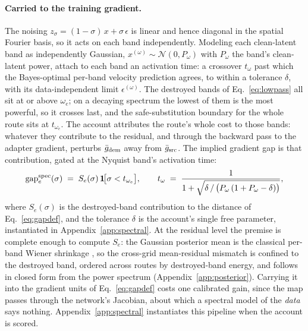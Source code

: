 \paragraph{Carried to the training gradient.}
The noising $z_\sigma = (1-\sigma)\,x + \sigma\,\epsilon$ is linear
and hence diagonal in the spatial Fourier basis, so it acts on each
band independently. Modeling each clean-latent band as independently
Gaussian, $x^{(\omega)} \sim \mathcal{N}(0, P_\omega)$ with
$P_\omega$ the band's clean-latent power, \citet{xiao2026spd} attach
to each band an activation time: a crossover $t_\omega$ past which
the Bayes-optimal per-band velocity prediction agrees, to within a
tolerance $\delta$, with its data-independent limit
$\epsilon^{(\omega)}$.
The destroyed bands of Eq.~\ref{eq:lowpass} all sit at or above
$\omega_e$; on a decaying spectrum the lowest of them is the most
powerful, so it crosses last, and the safe-substitution boundary for
the whole route sits at $t_{\omega_e}$. The account attributes the
route's whole cost to those bands: whatever they contribute to the
residual, and through the backward pass to the adapter gradient,
perturbs $\bar g_{\mathrm{dem}}$ away from $\bar g_{\mathrm{src}}$. The implied
gradient gap is that contribution, gated at the Nyquist band's
activation time:
\begin{equation}
\mathrm{gap}_e^{\mathrm{spec}}(\sigma) \;=\;
S_e(\sigma)\,\mathbf{1}\!\big[\sigma < t_{\omega_e}\big],
\qquad
t_\omega \;=\;
\frac{1}{1 + \sqrt{\delta \,/\, \big(P_\omega\,(1 + P_\omega -
\delta)\big)}},
\label{eq:spd}
\end{equation}
where $S_e(\sigma)$ is the destroyed-band contribution to the distance
of Eq.~\ref{eq:gapdef}, and the tolerance $\delta$ is the account's
single free parameter, instantiated in Appendix~\ref{app:spectral}.
At the residual level the premise is complete enough to compute
$S_e$: the Gaussian posterior mean is the classical
per-band Wiener shrinkage \citep{wiener1949}, so the cross-grid
mean-residual mismatch is confined to the destroyed band, ordered
across routes by destroyed-band energy, and follows in closed form
from the power spectrum (Appendix~\ref{app:posterior}). Carrying it
into the gradient units of Eq.~\ref{eq:gapdef} costs one calibrated
gain, since the map passes through the network's Jacobian, about which
a spectral model of the \emph{data} says nothing.
Appendix~\ref{app:spectral} instantiates this pipeline when
the account is scored.

